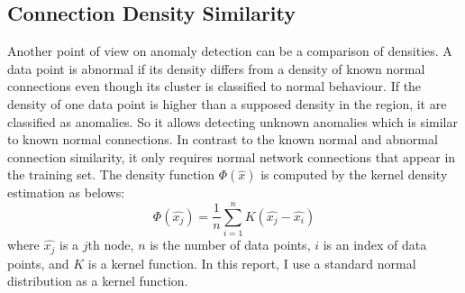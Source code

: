 \subsection{Connection Density Similarity}
\label{subsec:densitysimilarity}
Another point of view on anomaly detection can be a comparison of densities. 
A data point is abnormal if its density differs from a density of known normal connections even though its cluster is classified to normal behaviour. 
If the density of one data point is higher than a supposed density in the region, it are classified as anomalies. 
So it allows detecting unknown anomalies which is similar to known normal connections. 
In contrast to the known normal and abnormal connection similarity, it only requires normal network connections that appear in the training set. 
The density function $\Phi(\hat{x})$ is computed by the kernel density estimation \cite{ester96} as belows:
\begin{equation}
    \Phi(\hat{x_j}) = \dfrac{1}{n} \sum \limits_{i=1}^{n} K(\hat{x_j} - \hat{x_i})
\end{equation}
where $\hat{x_j}$ is a $j$th node, 
$n$ is the number of data points, 
$i$ is an index of data points, 
and $K$ is a kernel function. 
In this report, I use a standard normal distribution as a kernel function. 
%
